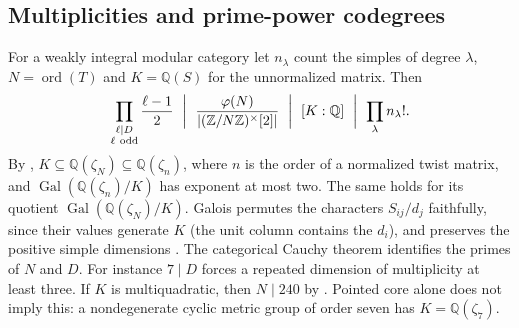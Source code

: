 \documentclass[11pt,a4paper]{article}
\numberwithin{equation}{section}
\theoremstyle{remark}
\newcommand{\ZZ}{\mathbb Z}
\newcommand{\QQ}{\mathbb Q}
\begin{document}
\subsection{Multiplicities and prime-power codegrees}\label{fam:M:sec:13.2}
For a weakly integral modular category let $n_\lambda$ count the
simples of degree $\lambda$, $N=\operatorname{ord}(T)$ and
$K=\QQ(S)$ for the unnormalized matrix. Then
\[
 \prod_{\substack{\ell\mid D\\\ell\ {\rm odd}}}\frac{\ell-1}{2}
 \ \biggm|\ \frac{\varphi(N)}{|(\ZZ/N\ZZ)^\times[2]|}
 \ \biggm|\ [K:\QQ]\ \biggm|\ \prod_\lambda n_\lambda! .
\]
By \cite[Theorems~2.3 and~2.5(a), Lemma~2.6]{BNRWClass},
$K\subseteq\QQ(\zeta_N)\subseteq\QQ(\zeta_n)$, where $n$ is the order
of a normalized twist matrix, and $\operatorname{Gal}(\QQ(\zeta_n)/K)$
has exponent at most two. The same holds for its quotient
$\operatorname{Gal}(\QQ(\zeta_N)/K)$. Galois permutes the characters
$S_{ij}/d_j$ faithfully, since their values generate $K$ (the unit
column contains the $d_i$), and preserves the positive simple dimensions
\cite[Lemma~3.9]{BNRWClass}. The categorical Cauchy theorem
\cite[Theorem~3.9]{BNRWFinite} identifies the primes of $N$ and $D$.
For instance $7\mid D$ forces a repeated dimension of multiplicity at
least three. If $K$ is multiquadratic, then $N\mid240$
by \cite[Corollary~3.14]{BNRWClass}. Pointed core alone does not imply
this: a nondegenerate cyclic metric group of order seven has
$K=\QQ(\zeta_7)$.
\end{document}
